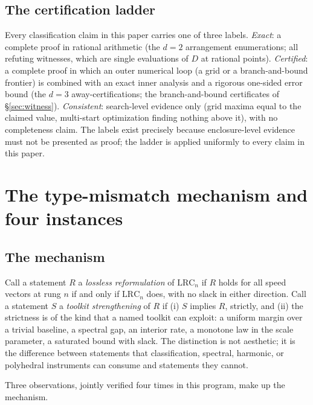 \documentclass[11pt,a4paper]{article}
\numberwithin{equation}{section}
\theoremstyle{plain}
\theoremstyle{definition}
\theoremstyle{remark}
\newcommand{\lrc}{\mathrm{LRC}}
\begin{document}
\subsection{The certification ladder}

Every classification claim in this paper carries one of three labels.
\emph{Exact}: a complete proof in rational arithmetic (the $d=2$
arrangement enumerations; all refuting witnesses, which are single
evaluations of $D$ at rational points). \emph{Certified}: a complete
proof in which an outer numerical loop (a grid or a branch-and-bound
frontier) is combined with an exact inner analysis and a rigorous
one-sided error bound (the $d=3$ away-certifications; the
branch-and-bound certificates of \S\ref{sec:witness}). \emph{Consistent}:
search-level evidence only (grid maxima equal to the claimed value,
multi-start optimization finding nothing above it), with no completeness
claim. The labels exist precisely because enclosure-level evidence must
not be presented as proof; the ladder is applied uniformly to every
claim in this paper.


\section{The type-mismatch mechanism and four instances}\label{sec:tm}

\subsection{The mechanism}\label{sec:tm-mech}

Call a statement $R$ a \emph{lossless reformulation} of $\lrc_n$ if $R$
holds for all speed vectors at rung $n$ if and only if $\lrc_n$ does, with
no slack in either direction. Call a statement $S$ a \emph{toolkit
strengthening} of $R$ if (i) $S$ implies $R$, strictly, and (ii) the
strictness is of the kind that a named toolkit can exploit: a uniform
margin over a trivial baseline, a spectral gap, an interior rate, a
monotone law in the scale parameter, a saturated bound with slack. The
distinction is not aesthetic; it is the difference between statements
that classification, spectral, harmonic, or polyhedral instruments can
consume and statements they cannot.

Three observations, jointly verified four times in this program, make up
the mechanism.
\end{document}
